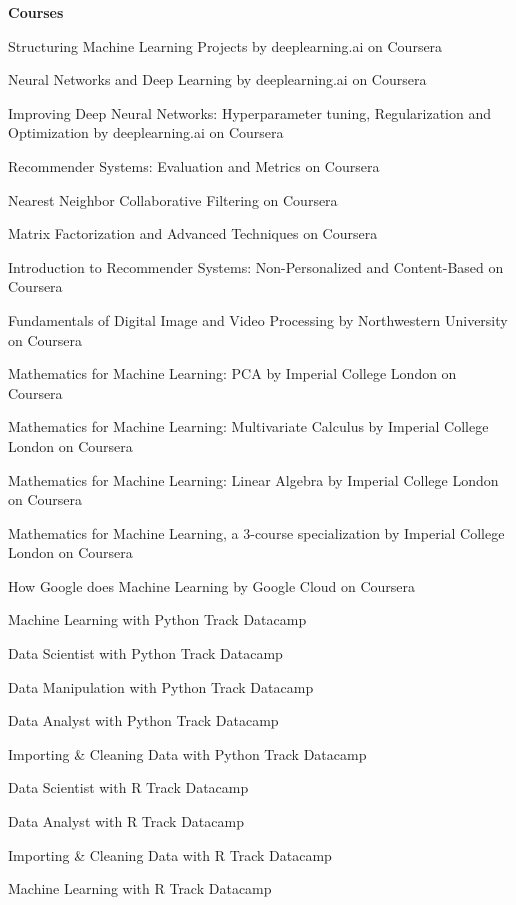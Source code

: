   \begin{cventries}

 \cventry
 {\bf Courses}
 {}
 {}
 {}
    {
      \begin{cvitems} %
        \item {Structuring Machine Learning Projects by deeplearning.ai on Coursera}
        \item {Neural Networks and Deep Learning by deeplearning.ai on Coursera}
        \item {Improving Deep Neural Networks: Hyperparameter tuning, Regularization and Optimization by deeplearning.ai on Coursera}
        \item {Recommender Systems: Evaluation and Metrics on Coursera}
        \item {Nearest Neighbor Collaborative Filtering on Coursera}
        \item {Matrix Factorization and Advanced Techniques on Coursera}
        \item {Introduction to Recommender Systems: Non-Personalized and Content-Based  on Coursera}
        \item {Fundamentals of Digital Image and Video Processing by Northwestern University on Coursera}
        \item {Mathematics for Machine Learning: PCA by Imperial College London on Coursera}
        \item {Mathematics for Machine Learning: Multivariate Calculus by Imperial College London on Coursera}
        \item {Mathematics for Machine Learning: Linear Algebra by Imperial College London on Coursera}
        \item {Mathematics for Machine Learning, a 3-course specialization by Imperial College London on Coursera}
        \item {How Google does Machine Learning by Google Cloud on Coursera}
        \item {Machine Learning with Python Track Datacamp}
        \item {Data Scientist with Python Track Datacamp}
        \item {Data Manipulation with Python Track Datacamp}
        \item {Data Analyst with Python Track Datacamp}
        \item {Importing \& Cleaning Data with Python Track Datacamp}
        \item {Data Scientist with R Track Datacamp}
        \item {Data Analyst with R Track Datacamp}
        \item {Importing \& Cleaning Data with R Track Datacamp}
        \item {Machine Learning with R Track Datacamp}
      \end{cvitems}
    }

\end{cventries}
